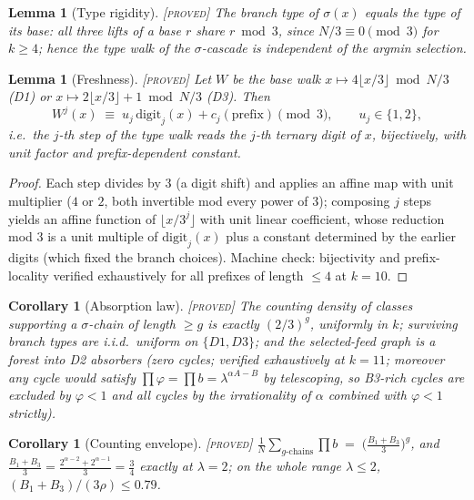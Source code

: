 \documentclass[11pt]{article}
\newtheorem{lemma}[theorem]{Lemma}
\newtheorem{corollary}[theorem]{Corollary}
\theoremstyle{definition}
\newcommand{\PROVED}{\textup{[\textsc{proved}]}}
\newcommand{\lam}{\lambda}
\begin{document}
\begin{lemma}[Type rigidity]\label{lem:type} \PROVED{}
The branch type of $\sigma(x)$ equals the type of its base: all three lifts of a
base $r$ share $r \bmod 3$, since $N/3 \equiv 0 \pmod 3$ for $k \ge 4$; hence the
type walk of the $\sigma$-cascade is independent of the argmin selection.
\end{lemma}

\begin{lemma}[Freshness]\label{lem:fresh} \PROVED{}
Let $W$ be the base walk $x \mapsto 4\lfloor x/3\rfloor \bmod N/3$ (D1) or
$x \mapsto 2\lfloor x/3\rfloor + 1 \bmod N/3$ (D3). Then
\[
W^j(x) \;\equiv\; u_j \,\mathrm{digit}_j(x) + c_j(\text{prefix}) \pmod 3,
\qquad u_j \in \{1,2\},
\]
i.e.\ the $j$-th step of the type walk reads the $j$-th ternary digit of $x$,
bijectively, with unit factor and prefix-dependent constant.
\end{lemma}
\begin{proof}
Each step divides by $3$ (a digit shift) and applies an affine map with unit
multiplier ($4$ or $2$, both invertible mod every power of $3$); composing $j$
steps yields an affine function of $\lfloor x/3^j \rfloor$ with unit linear
coefficient, whose reduction mod $3$ is a unit multiple of $\mathrm{digit}_j(x)$
plus a constant determined by the earlier digits (which fixed the branch choices).
Machine check: bijectivity and prefix-locality verified exhaustively for all
prefixes of length $\le 4$ at $k = 10$.
\end{proof}

\begin{corollary}[Absorption law]\label{cor:absorb} \PROVED{}
The counting density of classes supporting a $\sigma$-chain of length $\ge g$ is
exactly $(2/3)^g$, uniformly in $k$; surviving branch types are i.i.d.\ uniform
on $\{D1, D3\}$; and the selected-feed graph is a forest into D2 absorbers
(zero cycles; verified exhaustively at $k=11$; moreover any cycle would satisfy
$\prod \varphi = \prod b = \lam^{\alpha A - B}$ by telescoping, so B3-rich cycles
are excluded by $\varphi < 1$ and all cycles by the irrationality of $\alpha$
combined with $\varphi<1$ strictly).
\end{corollary}

\begin{corollary}[Counting envelope]\label{cor:envelope} \PROVED{}
$\displaystyle \frac1N \sum_{\text{$g$-chains}} \prod b \;=\;
\Big(\frac{B_1+B_3}{3}\Big)^{g}$, and
$\frac{B_1+B_3}{3} = \frac{2^{\alpha-2}+2^{\alpha-1}}{3} = \frac34$ exactly at
$\lam = 2$; on the whole range $\lam \le 2$, $(B_1+B_3)/(3\rho) \le 0.79$.
\end{corollary}
\end{document}
